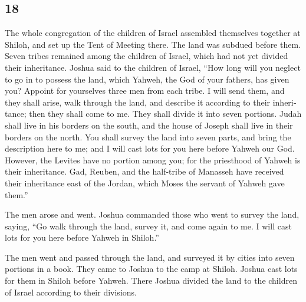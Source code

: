 \begin{paracol}{2}
\switchcolumn
\begin{otherlanguage}{english}

\hypertarget{section-35}{%
\section{18}\label{section-35}}

 The whole congregation of the children of Israel
assembled themselves together at Shiloh, and set up the Tent of Meeting
there. The land was subdued before them.  Seven tribes
remained among the children of Israel, which had not yet divided their
inheritance.  Joshua said to the children of Israel, ``How
long will you neglect to go in to possess the land, which Yahweh, the
God of your fathers, has given you?  Appoint for
yourselves three men from each tribe. I will send them, and they shall
arise, walk through the land, and describe it according to their
inheritance; then they shall come to me.  They shall
divide it into seven portions. Judah shall live in his borders on the
south, and the house of Joseph shall live in their borders on the north.
 You shall survey the land into seven parts, and bring the
description here to me; and I will cast lots for you here before Yahweh
our God.  However, the Levites have no portion among you;
for the priesthood of Yahweh is their inheritance. Gad, Reuben, and the
half-tribe of Manasseh have received their inheritance east of the
Jordan, which Moses the servant of Yahweh gave them.''

 The men arose and went. Joshua commanded those who went
to survey the land, saying, ``Go walk through the land, survey it, and
come again to me. I will cast lots for you here before Yahweh in
Shiloh.''

 The men went and passed through the land, and surveyed it
by cities into seven portions in a book. They came to Joshua to the camp
at Shiloh.  Joshua cast lots for them in Shiloh before
Yahweh. There Joshua divided the land to the children of Israel
according to their divisions.


\end{otherlanguage}
\end{paracol}
